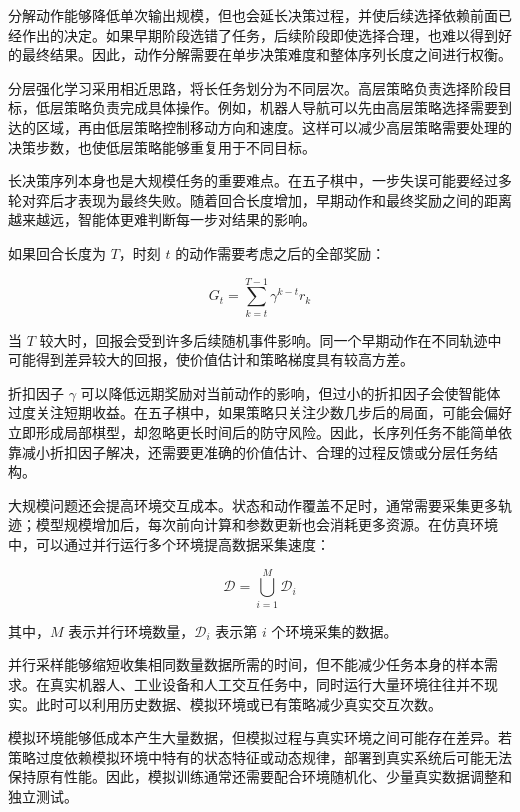 \documentclass[UTF8,a4paper,zihao=-4,oneside,openany]{ctexbook}
\begin{document}
分解动作能够降低单次输出规模，但也会延长决策过程，并使后续选择依赖前面已经作出的决定。如果早期阶段选错了任务，后续阶段即使选择合理，也难以得到好的最终结果。因此，动作分解需要在单步决策难度和整体序列长度之间进行权衡。

分层强化学习采用相近思路，将长任务划分为不同层次。高层策略负责选择阶段目标，低层策略负责完成具体操作。例如，机器人导航可以先由高层策略选择需要到达的区域，再由低层策略控制移动方向和速度。这样可以减少高层策略需要处理的决策步数，也使低层策略能够重复用于不同目标。

长决策序列本身也是大规模任务的重要难点。在五子棋中，一步失误可能要经过多轮对弈后才表现为最终失败。随着回合长度增加，早期动作和最终奖励之间的距离越来越远，智能体更难判断每一步对结果的影响。

如果回合长度为 $T$，时刻 $t$ 的动作需要考虑之后的全部奖励：

\begin{equation}
G_t
=
\sum_{k=t}^{T-1}
\gamma^{k-t}r_k
\end{equation}

当 $T$ 较大时，回报会受到许多后续随机事件影响。同一个早期动作在不同轨迹中可能得到差异较大的回报，使价值估计和策略梯度具有较高方差。

折扣因子 $\gamma$ 可以降低远期奖励对当前动作的影响，但过小的折扣因子会使智能体过度关注短期收益。在五子棋中，如果策略只关注少数几步后的局面，可能会偏好立即形成局部棋型，却忽略更长时间后的防守风险。因此，长序列任务不能简单依靠减小折扣因子解决，还需要更准确的价值估计、合理的过程反馈或分层任务结构。

大规模问题还会提高环境交互成本。状态和动作覆盖不足时，通常需要采集更多轨迹；模型规模增加后，每次前向计算和参数更新也会消耗更多资源。在仿真环境中，可以通过并行运行多个环境提高数据采集速度：

\begin{equation}
\mathcal{D}
=
\bigcup_{i=1}^{M}
\mathcal{D}_i
\end{equation}

其中，$M$ 表示并行环境数量，$\mathcal{D}_i$ 表示第 $i$ 个环境采集的数据。

并行采样能够缩短收集相同数量数据所需的时间，但不能减少任务本身的样本需求。在真实机器人、工业设备和人工交互任务中，同时运行大量环境往往并不现实。此时可以利用历史数据、模拟环境或已有策略减少真实交互次数。

模拟环境能够低成本产生大量数据，但模拟过程与真实环境之间可能存在差异。若策略过度依赖模拟环境中特有的状态特征或动态规律，部署到真实系统后可能无法保持原有性能。因此，模拟训练通常还需要配合环境随机化、少量真实数据调整和独立测试。
\end{document}
